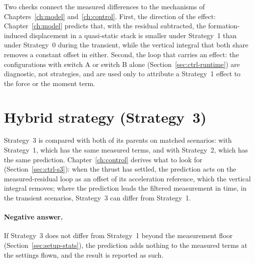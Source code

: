 Two checks connect the measured differences to the mechanisms of Chapters~\ref{ch:model}
and~\ref{ch:control}. First, the direction of the effect: Chapter~\ref{ch:model} predicts that, with
the residual subtracted, the formation-induced displacement in a quasi-static stack is smaller under
Strategy~1 than under Strategy~0 during the transient, while the vertical integral that both share
removes a constant offset in either. Second, the loop that carries an effect: the configurations
with switch A or switch B alone (Section~\ref{sec:ctrl-runtime}) are diagnostic, not strategies,
and are used only to attribute a Strategy~1 effect to the force or the moment term.


\section{Hybrid strategy (Strategy~3)}
\label{sec:res2-hybrid}

Strategy~3 is compared with both of its parents on matched scenarios: with Strategy~1, which has the
same measured terms, and with Strategy~2, which has the same prediction. Chapter~\ref{ch:control}
derives what to look for (Section~\ref{sec:ctrl-s3}): when the thrust has settled, the prediction
acts on the measured-residual loop as an offset of its acceleration reference, which the vertical
integral removes; where the prediction leads the filtered measurement in time, in the transient
scenarios, Strategy~3 can differ from Strategy~1.


\paragraph{Negative answer.} If Strategy~3 does not differ from Strategy~1 beyond the measurement
floor (Section~\ref{sec:setup-stats}), the prediction adds nothing to the measured terms at the
settings flown, and the result is reported as such.


